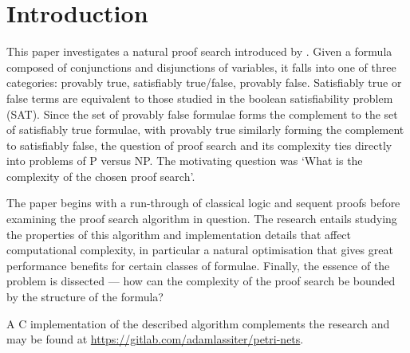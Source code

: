 \chapter{Introduction}
    
    This paper investigates a natural proof search introduced by \citet{petri-nets}.
    Given a formula composed of conjunctions and disjunctions of variables, it falls into one of three categories: provably true, satisfiably true/false, provably false.
    Satisfiably true or false terms are equivalent to those studied in the boolean satisfiability problem (SAT).
    Since the set of provably false formulae forms the complement to the set of satisfiably true formulae, with provably true similarly forming the complement to satisfiably false, the question of proof search and its complexity ties directly into problems of P versus NP\@.
    The motivating question was `What is the complexity of the chosen proof search'.
    
    The paper begins with a run-through of classical logic and sequent proofs before examining the proof search algorithm in question.
    The research entails studying the properties of this algorithm and implementation details that affect computational complexity, in particular a natural optimisation that gives great performance benefits for certain classes of formulae.
    Finally, the essence of the problem is dissected --- how can the complexity of the proof search be bounded by the structure of the formula?
    
    A C implementation of the described algorithm complements the research and may be found at \url{https://gitlab.com/adamlassiter/petri-nets}.
